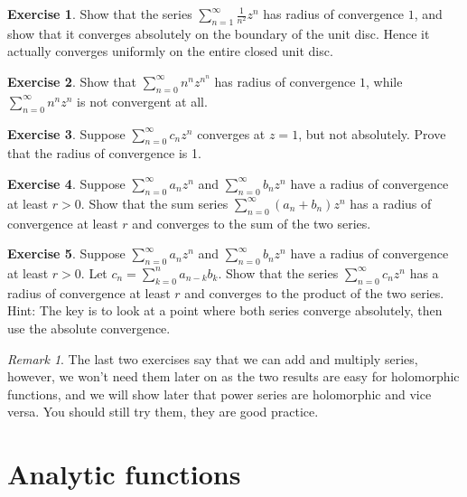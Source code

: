 \documentclass[12pt,openany]{book}
\theoremstyle{plain}
\theoremstyle{remark}
\newtheorem{remark}[thm]{Remark}
\theoremstyle{definition}
\newenvironment{exbox}{%
    \def\FrameCommand{\vrule width 1pt \relax\hspace {10pt}}%
    \MakeFramed {\advance \hsize -\width \FrameRestore }%
}{%
    \endMakeFramed
}
\theoremstyle{exercise}
\newtheorem{exercise}{Exercise}[section]
\theoremstyle{example}
\begin{document}
\begin{exbox}
\begin{exercise}
Show that the series $\sum_{n=1}^\infty \frac{1}{n^2} z^{n}$ has radius of
convergence $1$, and
show that it converges absolutely on the boundary of the unit disc.  Hence
it actually converges uniformly on the entire closed unit disc.
\end{exercise}

\begin{exercise}
Show that
$\sum_{n=0}^\infty n^n z^{n^n}$ has radius of convergence $1$,
while
$\sum_{n=0}^\infty n^n z^{n}$ is not convergent at all.
\end{exercise}

\begin{exercise}
Suppose
$\sum_{n=0}^\infty c_n z^{n}$ converges at $z=1$, but not absolutely.
Prove that the radius of convergence is 1.
\end{exercise}

\begin{exercise}
Suppose
$\sum_{n=0}^\infty a_n z^{n}$ and $\sum_{n=0}^\infty b_n z^{n}$
have a radius of convergence at least $r > 0$.  Show that
the sum series
$\sum_{n=0}^\infty (a_n+b_n) z^{n}$ has a radius of convergence at least
$r$ and converges to the sum of the two series.
\end{exercise}

\begin{exercise}
Suppose
$\sum_{n=0}^\infty a_n z^{n}$ and $\sum_{n=0}^\infty b_n z^{n}$
have a radius of convergence at least $r > 0$.  Let 
$c_n = \sum_{k=0}^n a_{n-k}b_k$.  Show that
the series
$\sum_{n=0}^\infty c_n z^{n}$ has a radius of convergence at least
$r$ and converges to the product of the two series.
Hint: The key is to look at a point where both series converge absolutely,
then use the absolute convergence.
\end{exercise}
\end{exbox}

\begin{remark}
The last two exercises say that we can add and multiply series, however,
we won't need them later on as the two results are easy for holomorphic
functions, and we will show later that power series are
holomorphic and vice versa.  You should still try them, they are good
practice.
\end{remark}


\section{Analytic functions}
\label{sec:analfuncs}
\end{document}
